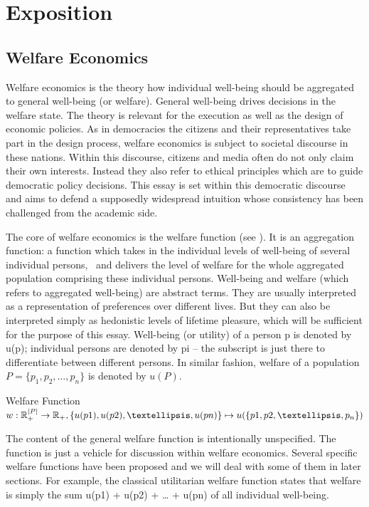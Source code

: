 \chapter{Exposition}
\section{Welfare Economics}

Welfare economics is the theory how individual well-being should be aggregated to general well-being (or welfare). General well-being drives decisions in the welfare state. The theory is relevant for the execution as well as the design of economic policies. As in democracies the citizens and their representatives take part in the design process, welfare economics is subject to societal discourse in these nations. Within this discourse, citizens and media often do not only claim their own interests. Instead they also refer to ethical principles which are to guide democratic policy decisions. This essay is set within this democratic discourse and aims to defend a supposedly widespread intuition whose consistency has been challenged from the academic side.  

The core of welfare economics is the welfare function (see ). It is an aggregation function: a function which takes in the individual levels of well-being of several individual persons, \ and delivers the level of welfare for the whole aggregated population comprising these individual persons. Well-being and welfare (which refers to aggregated well-being) are abstract terms. They are usually interpreted as a representation of preferences over different lives. But they can also be interpreted simply as hedonistic levels of lifetime pleasure, which will be sufficient for the purpose of this essay. Well-being (or utility) of a person p is denoted by u(p); individual persons are denoted by pi – the subscript is just there to differentiate between different persons. In similar fashion, welfare of a population $P = \{ p_1, p_2, …, p_n \}$ is denoted by $u(P)$. 

\begin{Definition}{Welfare Function}{}
$
  w: \hfill
  \mathbb{R}_+^{|P|} \rightarrow \mathbb{R}_+, \hfill
  \{ u(p1), u(p2), …, u(pn) \} \mapsto u( \{ p1, p2, …, p_n \} ) 
$
\end{Definition}

The content of the general welfare function is intentionally unspecified. The function is just a vehicle for discussion within welfare economics. Several specific welfare functions have been proposed and we will deal with some of them in later sections. For example, the classical utilitarian welfare function states that welfare is simply the sum u(p1) + u(p2) + … + u(pn) of all individual well-being.  

